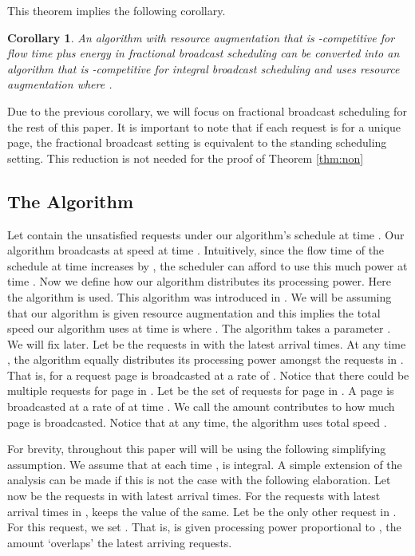 \documentclass[11pt]{article}
\newtheorem{corollary}[lemma]{Corollary}
\begin{document}
This theorem implies the following corollary.
\begin{corollary} \label{cor}
An algorithm with  resource augmentation that is -competitive for flow time plus energy in fractional broadcast scheduling can be converted into an algorithm that is -competitive for integral broadcast scheduling and uses  resource augmentation where .  
\end{corollary}

Due to the previous corollary, we will focus on fractional broadcast scheduling for the rest of this paper.  It is important to note that if each request is for a unique page, the fractional broadcast setting is equivalent to the standing scheduling setting. This reduction is not needed for the proof of Theorem \ref{thm:non}

\subsection{The Algorithm}

Let  contain the unsatisfied requests under our algorithm's schedule at time .  Our algorithm broadcasts at speed  at time .   Intuitively, since the flow time of the schedule at time  increases by , the scheduler can afford to use this much power at time .   Now we define how our algorithm distributes its processing power.  Here the algorithm  is used.  This algorithm was introduced in \cite{EdmondsP09,BansalKN09}.    We will be assuming that our algorithm is given  resource augmentation and this implies the total speed our algorithm uses at time  is  where .  The algorithm   takes a parameter .  We will fix  later.  Let  be the  requests in  with the latest arrival times. At any time , the algorithm equally distributes its processing power amongst the requests in .  That is, for a request  page  is broadcasted at a rate of . Notice that there could be multiple requests for page  in . Let  be the set of requests for page  in . A page  is broadcasted at a rate of  at time .  We call  the amount  contributes to how much page  is broadcasted.  Notice that at any time, the algorithm uses total speed .

For brevity, throughout this paper will will be using the following simplifying assumption.   We assume that at each time ,  is integral.  A simple extension of the analysis can be made if this is not the case with the following elaboration.   Let  now be the  requests in  with latest arrival times. For the  requests with latest arrival times in ,  keeps the value of  the same.  Let  be the only other request in . For this request, we set .  That is,  is given processing power proportional to , the amount  `overlaps' the  latest arriving requests.
\end{document}
